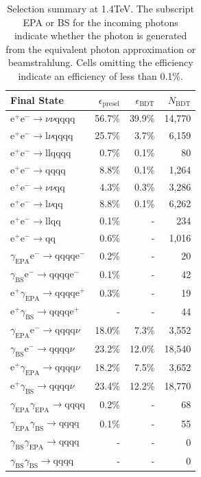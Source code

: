 \begin{table}[h!]
\centering
\begin{tabular}{ l r r r }
\hline
Final State & $\epsilon_{\text{presel}}$ & $\epsilon_{\text{BDT}}$ & $N_{\text{BDT}}$ \\ 
\hline
$\text{e}^{+}\text{e}^{-} \rightarrow \nu{\nu}\text{qqqq}$ & 56.7\% & 39.9\% & 14,770 \\
$\text{e}^{+}\text{e}^{-} \rightarrow \text{l}\nu\text{qqqq}$ & 25.7\% & 3.7\% & 6,159 \\
$\text{e}^{+}\text{e}^{-} \rightarrow \text{llqqqq}$ & 0.7\% & 0.1\% & 80 \\
$\text{e}^{+}\text{e}^{-} \rightarrow \text{qqqq}$ & 8.8\% & 0.1\% & 1,264 \\
$\text{e}^{+}\text{e}^{-} \rightarrow \nu{\nu}\text{qq}$ & 4.3\% & 0.3\% & 3,286 \\
$\text{e}^{+}\text{e}^{-} \rightarrow \text{l}\nu\text{qq}$ & 8.8\% & 0.1\% & 6,262 \\
$\text{e}^{+}\text{e}^{-} \rightarrow \text{llqq}$ & 0.1\% & - & 234 \\
$\text{e}^{+}\text{e}^{-} \rightarrow \text{qq}$ & 0.6\% & - & 1,016 \\
$\gamma_{\text{EPA}}\text{e}^{-} \rightarrow \text{qqqq}\text{e}^{-}$ & 0.2\% & - & 20 \\
$\gamma_{\text{BS}}\text{e}^{-} \rightarrow \text{qqqq}\text{e}^{-}$ & 0.1\% & - & 42 \\
$\text{e}^{+}\gamma_{\text{EPA}} \rightarrow \text{qqqq}\text{e}^{+}$ & 0.3\% & - & 19 \\
$\text{e}^{+}\gamma_{\text{BS}} \rightarrow \text{qqqq}\text{e}^{+}$ & - & - & 44 \\
$\gamma_{\text{EPA}}\text{e}^{-} \rightarrow \text{qqqq}\nu$ & 18.0\% & 7.3\% & 3,552 \\
$\gamma_{\text{BS}}\text{e}^{-} \rightarrow \text{qqqq}\nu$ & 23.2\% & 12.0\% & 18,540 \\
$\text{e}^{+}\gamma_{\text{EPA}} \rightarrow \text{qqqq}\nu$ & 18.2\% & 7.5\% & 3,652 \\
$\text{e}^{+}\gamma_{\text{BS}} \rightarrow \text{qqqq}\nu$ & 23.4\% & 12.2\% & 18,770 \\
$\gamma_{\text{EPA}}\gamma_{\text{EPA}} \rightarrow \text{qqqq}$ & 0.2\% & - & 68 \\
$\gamma_{\text{EPA}}\gamma_{\text{BS}} \rightarrow \text{qqqq}$ & 0.1\% & - & 55 \\
$\gamma_{\text{BS}}\gamma_{\text{EPA}} \rightarrow \text{qqqq}$ & - & - & 0 \\
$\gamma_{\text{BS}}\gamma_{\text{BS}} \rightarrow \text{qqqq}$ & - & - & 0 \\
\hline
\end{tabular}
\caption[Selection summary at 1.4TeV.]{Selection summary at 1.4TeV.   The subscript EPA or BS for the incoming photons indicate whether the photon is generated from the equivalent photon approximation or beamstrahlung.  Cells omitting the efficiency indicate an efficiency of less than 0.1\%.}
\label{table:selectionsummary1400GeV}
\end{table}

